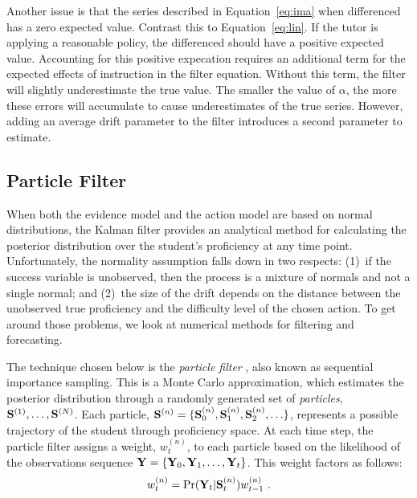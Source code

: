 \documentclass[12pt]{RR-article}
\begin{document}
Another issue is that the series described in Equation~\ref{eq:ima}
when differenced has a zero expected value.  Contrast this to
Equation~\ref{eq:lin}.  If the tutor is applying a reasonable policy,
the differenced should have a positive expected value.  Accounting for
this positive expecation requires an additional term for the expected
effects of instruction in the filter equation.  Without this term, the
filter will slightly underestimate the true value.  The smaller the
value of $\alpha$, the more these errors will accumulate to cause
underestimates of the true series.  However, adding an average drift
parameter to the filter introduces a second parameter to estimate.

\subsection{Particle Filter}
\label{subs:pf}

When both the evidence model and the action model are based on normal
distributions, the Kalman filter
\cite{KalmanBucy1961} provides an analytical method for calculating the
posterior distribution over the student's proficiency at any time
point.  Unfortunately, the normality assumption falls down in two 
respects:  (1)~if the success variable is unobserved, then the process
is a mixture of normals and not a single normal; and (2)~the size of
the drift depends on the distance between the unobserved true
proficiency and the difficulty level of the chosen action.  To get
around those problems, we look at numerical methods for filtering and
forecasting.  

The technique chosen below is the \textit{particle filter}
\cite{Doucet2001,Liu2001}, also known as sequential importance
sampling.  This is a Monte Carlo approximation, which estimates the
posterior distribution through a randomly generated set of
\textit{particles}, ${\bf S}^{(1)}, \ldots, {\bf S}^{(N)}$.  Each
particle, ${\bf S}^{(n)} = \{ {\bf S}^{(n)}_0, {\bf S}^{(n)}_1, {\bf
S}^{(n)}_2, \ldots\}$, represents a possible trajectory of the
student through proficiency space.  At each time step, the particle
filter assigns a weight, $w^{(n)}_t$, to each particle based on the
likelihood of the observations sequence ${\bf Y} = \{{\bf Y}_0, {\bf
Y}_1, \ldots, {\bf Y}_t\}$.  This weight factors as follows:
\begin{equation}
\label{eq:pfweight}
w^{(n)}_t = \Pr({\bf Y}_t | {\bf S}^{(n)}_t) w^{(n)}_{t-1}
\ .
\end{equation}
\end{document}
